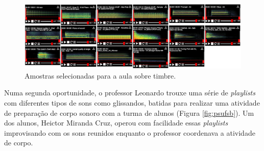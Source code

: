 \begin{figure}[hp]

\includegraphics[width=1\textwidth]{pictures/cap4/pstimbre}
\caption{Amostras selecionadas para a aula sobre timbre.}
\label{fig:amostrastimbre}
\end{figure}

Numa segunda oportunidade, o professor Leonardo trouxe uma série de \emph{playlists} com diferentes tipos de sons como glissandos, batidas para realizar uma atividade de preparação de corpo sonoro com a turma de alunos (Figura \ref{fig:psufsb}). Um dos alunos, Heictor Miranda Cruz, operou com facilidade essas \emph{playlists} improvisando com os sons reunidos enquanto o professor coordenava a atividade de corpo. 



